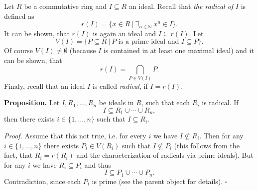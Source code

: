 \documentclass[12pt]{article}
\begin{document}
Let $R$ be a commutative ring and $I\subseteq R$ an ideal. Recall that \textit{the radical of} $I$ is defined as
$$r(I)=\{x\in R\ |\ \exists_{n\in\mathbb{N}}\ x^n\in I\}.$$
It can be shown, that $r(I)$ is again an ideal and $I\subseteq r(I)$. Let 
$$V(I)=\{P\subseteq R\ |\ P\mbox{ is a prime ideal and }I\subseteq P\}.$$
Of course $V(I)\neq\emptyset$ (because $I$ is contained in at least one maximal ideal) and it can be shown, that
$$r(I)=\bigcap_{P\in V(I)} P.$$
Finaly, recall that an ideal $I$ is called \textit{radical}, if $I=r(I)$.

\textbf{Proposition.} Let $I,R_1,\ldots,R_n$ be ideals in $R$, such that each $R_i$ is radical. If $$I\subseteq R_1\cup\cdots\cup R_n,$$ then there exists $i\in\{1,\ldots,n\}$ such that $I\subseteq R_i$.

\textit{Proof.} Assume that this not true, i.e. for every $i$ we have $I\not\subseteq R_i$. Then for any $i\in\{1,\ldots,n\}$ there exists $P_i\in V(R_i)$ such that $I\not\subseteq P_i$ (this follows from the fact, that $R_i=r(R_i)$ and the characterization of radicals via prime ideals). But for any $i$ we have $R_i\subseteq P_i$ and thus
$$I\subseteq P_1\cup\cdots\cup P_n.$$
Contradiction, since each $P_i$ is prime (see the parent object for details). $\square$
\end{document}
